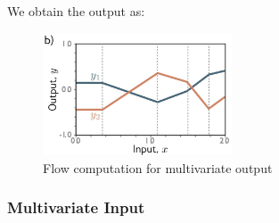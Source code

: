 We obtain the output as:

\begin{figure}[H]
    \centering
    \includegraphics[width=0.5\textwidth]{assets/mult_out.png}
    \caption{Flow computation for multivariate output}
    \label{fig:multi_out}
\end{figure}

\subsubsection{Multivariate Input}


